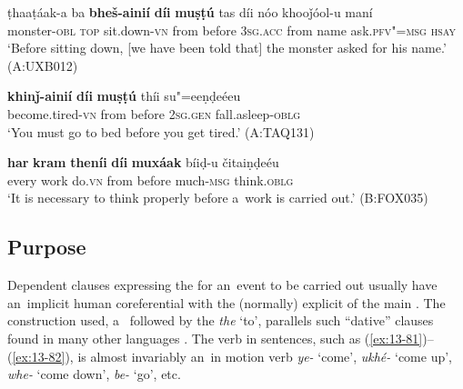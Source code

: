 \begin{exe}
\ex
\label{ex:13-78}
\gll ṭhaaṭáak-a ba \textbf{bheš-ainií} \textbf{díi} \textbf{muṣṭú} tas díi nóo khooǰóol-u maní \\
monster-\textsc{obl} \textsc{top} sit.down-\textsc{vn} from before \textsc{3sg.acc} from name ask.\textsc{pfv"=msg} \textsc{hsay} \\
\glt `Before sitting down, [we have been told that] the monster asked for his name.' (A:UXB012)

\ex
\label{ex:13-79}
\gll \textbf{khinǰ-ainií} \textbf{díi} \textbf{muṣṭú} thíi su"=eeṇḍeéeu  \\
become.tired-\textsc{vn} from before \textsc{2sg.gen} fall.asleep-\textsc{oblg} \\
\glt `You must go to bed before you get tired.' (A:TAQ131)

\ex
\label{ex:13-80}
\gll \textbf{har} \textbf{kram} \textbf{theníi} \textbf{díi} \textbf{muxáak} bíiḍ-u čitaiṇḍeéu  \\
every work do.\textsc{vn} from before much-\textsc{msg} think.\textsc{oblg} \\
\glt `It is necessary to think properly before a~work is carried out.' (B:FOX035)
\end{exe}

\subsection{Purpose}
\label{subsec:13-4-2}

Dependent clauses expressing the  for an~event to be carried out usually have an~implicit human  coreferential with the (normally) explicit  of the main  \citep[337]{givon2001b}. The construction used, a~ followed by the  \textit{the} `to', parallels such ``dative''  clauses found in many other languages \citep[251--252]{thompsonetal2007}. The  verb in sentences, such as (\ref{ex:13-81})--(\ref{ex:13-82}), is almost invariably an~in motion verb \textit{ye-} `come', \textit{ukhé-} `come up', \textit{whe-} `come down', \textit{be-} `go', etc.

